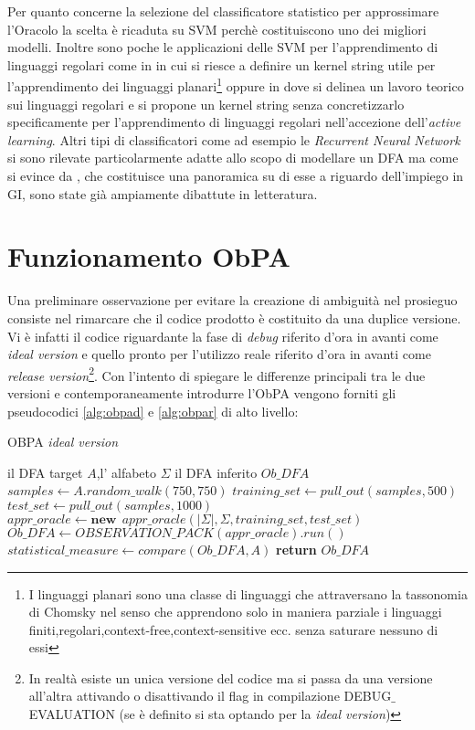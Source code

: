 Per quanto concerne la selezione del classificatore statistico per approssimare l'Oracolo la scelta è ricaduta su \ac{SVM} perchè costituiscono uno dei migliori modelli. Inoltre sono poche le applicazioni delle \ac{SVM} per l'apprendimento di linguaggi regolari come in \cite{Clark11}\cite{Clark06}  in cui si riesce a definire un kernel string utile per l'apprendimento dei linguaggi planari\footnote{I linguaggi planari sono una classe di linguaggi che attraversano la tassonomia di Chomsky nel senso che apprendono solo in maniera parziale i linguaggi finiti,regolari,context-free,context-sensitive ecc. senza saturare nessuno di essi}  oppure in \cite{Kontorovich09} dove si delinea un lavoro teorico sui linguaggi regolari e si propone un kernel string senza concretizzarlo specificamente per l'apprendimento di linguaggi regolari nell'accezione dell'\textit{active learning}. Altri tipi di classificatori come ad esempio le \textit{Recurrent Neural Network} si sono rilevate particolarmente adatte allo scopo di modellare un \ac{DFA} ma come si evince da \cite{Forcada02}, che costituisce una panoramica su di esse a riguardo dell'impiego in  \ac{GI}, sono state già ampiamente dibattute in letteratura.

\section{Funzionamento ObPA}
Una preliminare osservazione per evitare la creazione di ambiguità nel prosieguo consiste nel rimarcare che il codice prodotto è costituito da una duplice versione. Vi è infatti il codice riguardante la fase di \textit{debug} riferito d'ora in avanti come \textit{ideal version} e quello pronto per l'utilizzo reale riferito d'ora in avanti come \textit{release version}\footnote{In realtà esiste un unica versione del codice ma si passa da una versione all'altra attivando o disattivando il flag in compilazione DEBUG$\_$EVALUATION (se è definito si sta optando per la \textit{ideal version})}.  Con l'intento di spiegare le differenze principali tra le due versioni e contemporaneamente introdurre l'\ac{ObPA} vengono forniti gli pseudocodici \ref{alg:obpad} e \ref{alg:obpar} di alto livello:

\begin{algorithm}
\caption{OBPA \textit{ideal version}}\label{alg:obpad}
\begin{algorithmic}[1]
\Statex
\Input il \ac{DFA} target $A$,l' alfabeto $\Sigma$ 
\Output il \ac{DFA} inferito $Ob\_DFA$
\State $samples \gets A.random\_walk(750,750)$
\State $training\_set \gets pull\_out(samples,500)$
\State $test\_set \gets pull\_out(samples,1000)$
\State $appr\_oracle \gets \textbf{new}\:\: appr\_oracle(|\Sigma|,\Sigma,training\_set,test\_set)$
\State $Ob\_DFA \gets OBSERVATION\_PACK(appr\_oracle).run()$
\State $statistical\_measure \gets compare(Ob\_DFA , A)$
 \State \textbf{return} $Ob\_DFA$
     
\end{algorithmic}
\end{algorithm}




